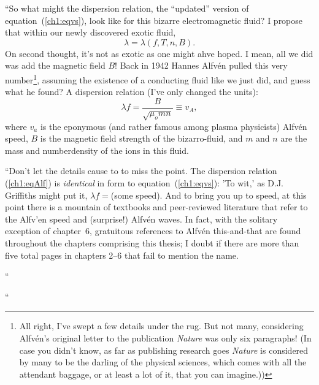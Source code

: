 \X ``So what might the dispersion relation, the ``updated'' version of
equation~(\ref{ch1:eqvs}), look like for this bizarre electromagnetic
fluid? I propose that within our newly discovered exotic fluid,
\begin{equation}
  \label{ch1:eqmhd}
  \lambda = \lambda (f, T, n, B).
\end{equation}
On second thought, it's not as exotic as one might ahve hoped. I mean,
all we did was add the magnetic field $B$! Back in 1942 Hannes
Alfv\'{e}n pulled this very number\footnote{All right, I've swept a
  few details under the rug. But not many, considering Alfv\'{e}n's
  original letter to the publication \textsl{Nature} was only six
  paragraphs! (In case you didn't know, as far as publishing research
  goes \textsl{Nature} is considered by many to be the darling of the
  physical sciences, which comes with all the attendant baggage, or at
  least a lot of it, that you can imagine.))}, assuming the existence
of a conducting fluid like we just did, and guess what he found? A
dispersion relation (I've only changed the units):
\begin{equation}
  \label{ch1:eqAlf}
  \lambda f = \frac{B}{\sqrt{\mu_o m n}} \equiv v_A,
\end{equation}
where $v_a$ is the eponymous (and rather famous among plasma
physicists) Alfv\'{e}n speed, $B$ is the magnetic field strength of
the bizarro-fluid, and $m$ and $n$ are the mass and numberdensity of
the ions in this fluid.


\X ``Don't let the details cause to to miss the point. The dispersion
relation (\ref{ch1:eqAlf}) is \emph{identical} in form to
equation~(\ref{ch1:eqvs}): 'To wit,' as D.J. Griffiths might put it, $
\lambda f = $(some speed). And to bring you up to speed, at this point
there is a mountain of textbooks and peer-reviewed literature that
refer to the Alfv'{e}n speed and (surprise!) Alfv\'{e}n waves. In
fact, with the solitary exception of chapter~6, gratuitous references
to Alfv\'{e}n this-and-that are found throughout the chapters
comprising this thesis; I doubt if there are more than five total
pages in chapters 2--6 that fail to mention the name.


\X ``


\X ``

% 
% 
\setlength\parindent{\savedparindent}
\setlength\parskip{\savedparskip}



